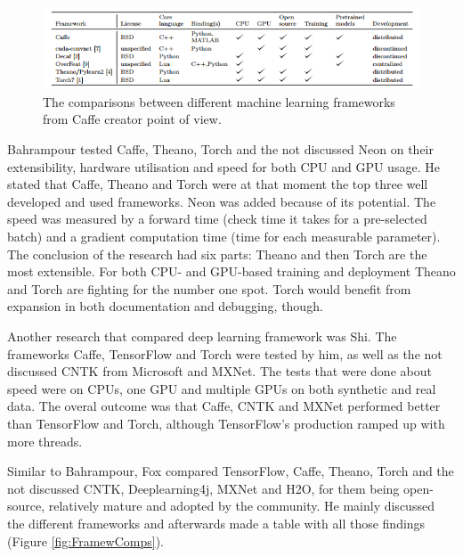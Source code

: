 \documentclass[10pt,a4paper]{article}
\begin{document}
	\begin{figure}[h!]
		\includegraphics{CaffeMachineLearningComparisons.PNG}
		\caption{The comparisons between different machine learning frameworks 
		from Caffe creator point of view. 
		\cite{DBLP:journals/corr/JiaSDKLGGD14}}
		\label{fig:CaffeMachLearnComp}
	\end{figure}

	Bahrampour tested Caffe, Theano, Torch and the not discussed Neon on their 
	extensibility, hardware utilisation and speed for both CPU and GPU usage. 
	He stated that Caffe, Theano and Torch were at that moment the top three 
	well developed and used frameworks. Neon was added because of its 
	potential. The speed was measured by a forward time (check time it takes 
	for a pre-selected batch) and a gradient computation time (time for each 
	measurable parameter). The conclusion of the research had six parts: Theano 
	and then Torch are the most extensible. For both CPU- and GPU-based 
	training and deployment Theano and Torch are fighting for the number one 
	spot. Torch would benefit from expansion in both documentation and 
	debugging, though. \cite{bahrampour2016comparative}

	Another research that compared deep learning framework was Shi. The 
	frameworks Caffe, TensorFlow and Torch were tested by him, as well as the 
	not discussed CNTK from Microsoft and MXNet. The tests that were done about 
	speed were on CPUs, one GPU and multiple GPUs on both synthetic and real 
	data. The overal outcome was that Caffe, CNTK and MXNet performed better 
	than TensorFlow and Torch, although TensorFlow's production ramped up with 
	more threads.
	\cite{DBLP:journals/corr/ShiWXC16}


	Similar to Bahrampour\cite{bahrampour2016comparative}, Fox compared 
	TensorFlow, Caffe, Theano, Torch and the not discussed CNTK, 
	Deeplearning4j, MXNet and H2O, for them being open-source, relatively 
	mature and adopted by the community. He mainly discussed the different 
	frameworks and afterwards made a table with all those findings (Figure 
	\ref{fig:FramewComps}). \cite{fox2016software}
	
\end{document}
